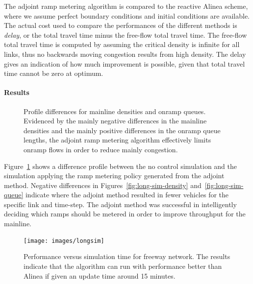 							The adjoint ramp metering algorithm is compared to the reactive Alinea
							scheme, where we assume perfect boundary conditions and initial conditions
							are available. The actual cost used to compare the performances of
							the different methods is \emph{delay}, or the total travel time minus
							the free-flow total travel time. The free-flow total travel time is
							computed by assuming the critical density is infinite for all links,
							thus no backwards moving congestion results from high density. The
							delay gives an indication of how much improvement is possible, given
							that total travel time cannot be zero at optimum.
							
							
							\paragraph{Results}
							
							\begin{figure}[t]
								\hfill{}
								
								\caption{Profile differences for mainline densities and onramp queues. Evidenced
									by the mainly negative differences in the mainline densities and the
									mainly positive differences in the onramp queue lengths, the adjoint
									ramp metering algorithm effectively limits onramp flows in order to
									reduce mainly congestion.\label{fig:long-sim}}
							\end{figure}
							
							
							Figure~\ref{fig:long-sim} shows a difference profile between the
							no control simulation and the simulation applying the ramp metering
							policy generated from the adjoint method. Negative differences in
							Figures~\ref{fig:long-sim-density} and~\ref{fig:long-sim-queue}
							indicate where the adjoint method resulted in fewer vehicles for the
							specific link and time-step. The adjoint method was successful in
							intelligently deciding which ramps should be metered in order to improve
							throughput for the mainline.
							\begin{figure}
								\begin{centering}
									\texttt{[image: images/longsim]}
									\par\end{centering}
									\caption{Performance versus simulation time for freeway network. The results
										indicate that the algorithm can run with performance better than Alinea
										if given an update time around 15 minutes.}\label{fig:running-time}
								\end{figure}
								
